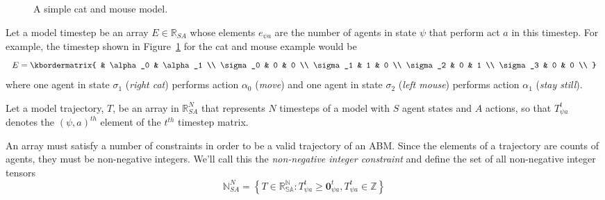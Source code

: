 \documentclass{article}
\begin{document}
\begin{figure}
	\centering
	\caption{A simple cat and mouse model.\label{fig:AB-MCMC-1}}
\end{figure}


Let a model timestep be an array $E \in \mathbb{R}_{SA}$ whose elements $e_{\psi a}$ are the number of agents in state $\psi$ that perform act $a$ in this timestep. For example, the timestep shown in Figure~\ref{fig:AB-MCMC-1} for the cat and mouse example would be
\[
E = \kbordermatrix{
	& \alpha_0 & \alpha_1 \\
	\sigma_0 & 0 & 0 \\
	\sigma_1 & 1 & 0 \\
	\sigma_2 & 0  & 1 \\
	\sigma_3 & 0 & 0 \\
}
\]
where one agent in state $\sigma_1$ (\textit{right cat}) performs action $\alpha_0$ (\textit{move}) and one agent in state $\sigma_2$ (\textit{left mouse}) performs action $\alpha_1$ (\textit{stay still}).

Let a model trajectory, $T$, be an array in $\mathbb{R}^N_{SA}$ that represents $N$ timesteps of a model with $S$ agent states and $A$ actions, so that $T^t_{\psi a}$ denotes the $(\psi, a)^{th}$ element of the $t^{th}$ timestep matrix.

An array must satisfy a number of constraints in order to be a valid trajectory of an ABM. Since the elements of a trajectory are counts of agents, they must be non-negative integers. We'll call this the \textit{non-negative integer constraint} and define the set of all non-negative integer tensors
\begin{equation}
\mathbb{N}^N_{SA} = \left\{ T \in \mathbb{R^N_{SA}}: T^t_{\psi a} \ge \mathbf{0}^t_{\psi a}, T^t_{\psi a} \in \mathbb{Z}\right\}
\label{nonNegativeInt}
\end{equation}
\end{document}
